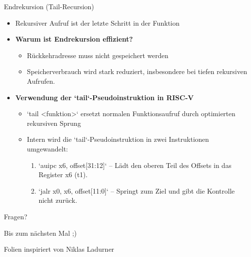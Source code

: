 \documentclass[
  german,            %
  aspectratio=169,    %
]{tumbeamer}
\begin{document}
\begin{frame}{Endrekursion (Tail-Recursion)}

  \begin{itemize}
      \item Rekursiver Aufruf ist der letzte Schritt in der Funktion \vspace{0.5cm}
      \item \textbf{Warum ist Endrekursion effizient?}
      \begin{itemize}
        \item Rückkehradresse muss nicht gespeichert werden
        \item Speicherverbrauch wird stark reduziert, insbesondere bei tiefen rekursiven Aufrufen.
      \end{itemize}
      \item \textbf{Verwendung der `tail`-Pseudoinstruktion in RISC-V}
      \begin{itemize}
        \item `tail <funktion>` ersetzt normalen Funktionsaufruf durch optimierten rekursiven Sprung
        \item Intern wird die `tail`-Pseudoinstruktion in zwei Instruktionen umgewandelt:
            \begin{enumerate}
        \item `auipc x6, offset[31:12]` – Lädt den oberen Teil des Offsets in das Register x6 (t1).
                \item `jalr x0, x6, offset[11:0]` – Springt zum Ziel und gibt die Kontrolle nicht zurück.
            \end{enumerate}
      \end{itemize}
  \end{itemize}
\end{frame}


\begin{frame}[c]{}{}
  \begin{center}
    \LARGE Fragen?
  \end{center}
  \vspace{0.5cm}
  \begin{center}
    \LARGE Bis zum nächsten Mal ;) \\
  \end{center}
  \vspace{1.0cm}
  \begin{center}
    \small Folien inspiriert von Niklas Ladurner
  \end{center}
\end{frame}
\end{document}
